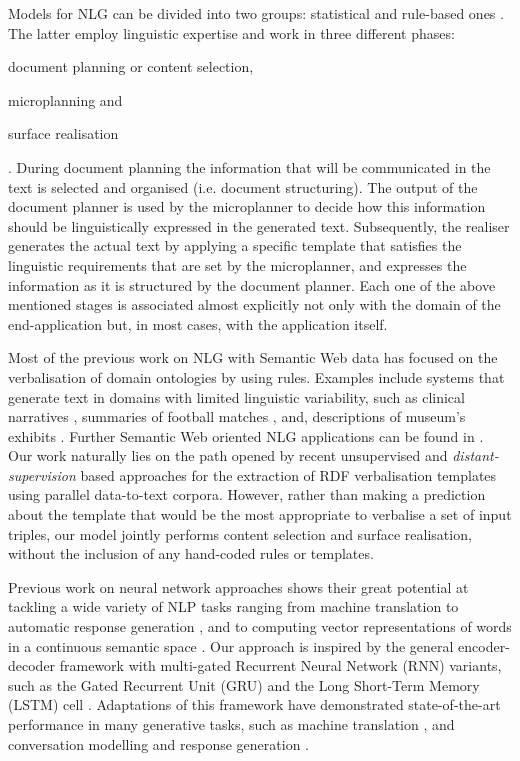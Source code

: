 \documentclass[preprint,5p]{elsarticle}
\begin{document}
Models for NLG can be divided into two groups: statistical and rule-based ones \cite{Reiter2000}. The latter employ linguistic expertise and work in three different phases:\begin{inparaenum}[(i)]\item document planning or content selection, \item microplanning and \item surface realisation \cite{Reiter2000,Bouayad-Agha2014}\end{inparaenum}. During document planning the information that will be communicated in the text is selected and organised (i.e. document structuring). The output of the document planner is used by the microplanner to decide how this information should be linguistically expressed in the generated text. Subsequently, the realiser generates the actual text by applying a specific template that satisfies the linguistic requirements that are set by the microplanner, and expresses the information as it is structured by the document planner. Each one of the above mentioned stages is associated almost explicitly not only with the domain of the end-application but, in most cases, with the application itself. 


Most of the previous work on NLG with Semantic Web data has focused on the verbalisation of domain ontologies by using rules. Examples include systems that generate text in domains with limited linguistic variability, such as clinical narratives \cite{Arguello2011}, summaries of football matches \cite{Bouayad-Agha2012}, and, descriptions of museum's exhibits \cite{Dannells2012}. Further Semantic Web oriented NLG applications can be found in \cite{Bouayad-Agha2014}. Our work naturally lies on the path opened by recent unsupervised \cite{Duma2013} and \textit{distant-supervision} \cite{Ell2014} based approaches for the extraction of RDF verbalisation templates using parallel data-to-text corpora. However, rather than making a prediction about the template that would be the most appropriate to verbalise a set of input triples, our model jointly performs content selection and surface realisation, without the inclusion of any hand-coded rules or templates.


Previous work on neural network approaches shows their great potential at tackling a wide variety of NLP tasks ranging from machine translation \cite{Cho2014,Sutskever2014} to automatic response generation \cite{Vinyals2015,Vougiouklis2016}, and to computing vector representations of words in a continuous semantic space \cite{Mikolov2013a}. Our approach is inspired by the general encoder-decoder framework \cite{Cho2014,Sutskever2014} with multi-gated Recurrent Neural Network (RNN) variants, such as the Gated Recurrent Unit (GRU) \cite{Cho2014} and the Long Short-Term Memory (LSTM) cell \cite{Hochreiter1997}. Adaptations of this framework have demonstrated state-of-the-art performance in many generative tasks, such as machine translation \cite{Cho2014,Sutskever2014,Vinyals2015b}, and conversation modelling and response generation \cite{Wen2015,Vinyals2015}.
\end{document}

